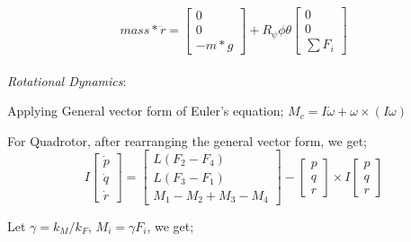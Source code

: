 \[
mass*\ddot{r} = \begin{bmatrix}
    0 \\
    0 \\
    -m*g
\end{bmatrix} + 
R_\psi\phi\theta \begin{bmatrix}
    0 \\
    0 \\
    \sum F_i
\end{bmatrix}
\]
\\

\textit{Rotational Dynamics}:




Applying General vector form of Euler's equation;
$M_c = I\dot{\omega} + \omega \times (I\omega)$

For Quadrotor, after rearranging the general vector form, we get;
\[
I\begin{bmatrix}
    \dot{p} \\
    \dot{q} \\
    \dot{r}
\end{bmatrix} = 
\begin{bmatrix}
    L(F_2 - F_4) \\
    L(F_3 - F_1) \\
    M_1 - M_2 + M_3 - M_4
\end{bmatrix} - 
\begin{bmatrix}
    p \\
    q \\
    r
\end{bmatrix}
\times I\begin{bmatrix}
    p \\
    q \\
    r
\end{bmatrix}
\]

Let $\gamma = k_M/k_F$, $M_i = \gamma F_i$, we get;


